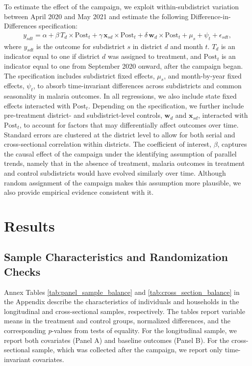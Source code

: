 To estimate the effect of the campaign, we exploit within-subdistrict variation between April 2020 and May 2021 and estimate the following Difference-in-Differences specification:
\begin{align} \label{eq:3}
y_{sdt} = \alpha + \beta \, T_{d} \times \text{Post}_{t} + \gamma \, \mathbf{x}_{sd} \times \text{Post}_{t} + \delta \, \mathbf{w}_{d} \times \text{Post}_{t} + \mu_{s} + \psi_{t} + \epsilon_{sdt},
\end{align}
where $y_{sdt}$ is the outcome for subdistrict $s$ in district $d$ and month $t$. $T_d$ is an indicator equal to one if district $d$ was assigned to treatment, and $\text{Post}_t$ is an indicator equal to one from September 2020 onward, after the campaign began. The specification includes subdistrict fixed effects, $\mu_s$, and month-by-year fixed effects, $\psi_t$, to absorb time-invariant differences across subdistricts and common seasonality in malaria outcomes. In all regressions, we also include state fixed effects interacted with $\text{Post}_t$. Depending on the specification, we further include pre-treatment district- and subdistrict-level controls, $\mathbf{w}_d$ and $\mathbf{x}_{sd}$, interacted with $\text{Post}_t$, to account for factors that may differentially affect outcomes over time. Standard errors are clustered at the district level to allow for both serial and cross-sectional correlation within districts. The coefficient of interest, $\beta$, captures the causal effect of the campaign under the identifying assumption of parallel trends, namely that in the absence of treatment, malaria outcomes in treatment and control subdistricts would have evolved similarly over time. Although random assignment of the campaign makes this assumption more plausible, we also provide empirical evidence consistent with it.


\section{Results}

\subsection{Sample Characteristics and Randomization Checks}

Annex Tables \ref{tab:panel_sample_balance} and \ref{tab:cross_section_balance} in the Appendix describe the characteristics of individuals and households in the longitudinal and cross-sectional samples, respectively. The tables report variable means in the treatment and control groups, normalized differences, and the corresponding \textit{p}-values from tests of equality. For the longitudinal sample, we report both covariates (Panel A) and baseline outcomes (Panel B). For the cross-sectional sample, which was collected after the campaign, we report only time-invariant covariates.

